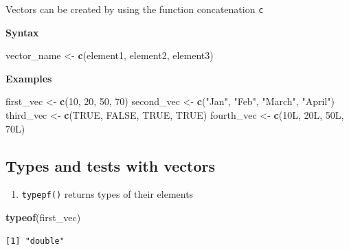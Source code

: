 \documentclass[]{book}
\newenvironment{Shaded}{\begin{snugshade}}{\end{snugshade}}
\newcommand{\DecValTok}[1]{\textcolor[rgb]{0.00,0.00,0.81}{#1}}
\newcommand{\KeywordTok}[1]{\textcolor[rgb]{0.13,0.29,0.53}{\textbf{#1}}}
\newcommand{\NormalTok}[1]{#1}
\newcommand{\OtherTok}[1]{\textcolor[rgb]{0.56,0.35,0.01}{#1}}
\newcommand{\StringTok}[1]{\textcolor[rgb]{0.31,0.60,0.02}{#1}}
\providecommand{\tightlist}{%
  \setlength{\itemsep}{0pt}\setlength{\parskip}{0pt}}
\begin{document}
Vectors can be created by using the function concatenation \texttt{c}

\textbf{Syntax}

\begin{Shaded}
\begin{Highlighting}[]
\NormalTok{vector_name <-}\StringTok{ }\KeywordTok{c}\NormalTok{(element1, element2, element3)}
\end{Highlighting}
\end{Shaded}

\textbf{Examples}

\begin{Shaded}
\begin{Highlighting}[]
\NormalTok{first_vec <-}\StringTok{ }\KeywordTok{c}\NormalTok{(}\DecValTok{10}\NormalTok{, }\DecValTok{20}\NormalTok{, }\DecValTok{50}\NormalTok{, }\DecValTok{70}\NormalTok{)}
\NormalTok{second_vec <-}\StringTok{ }\KeywordTok{c}\NormalTok{(}\StringTok{"Jan"}\NormalTok{, }\StringTok{"Feb"}\NormalTok{, }\StringTok{"March"}\NormalTok{, }\StringTok{"April"}\NormalTok{)}
\NormalTok{third_vec <-}\StringTok{ }\KeywordTok{c}\NormalTok{(}\OtherTok{TRUE}\NormalTok{, }\OtherTok{FALSE}\NormalTok{, }\OtherTok{TRUE}\NormalTok{, }\OtherTok{TRUE}\NormalTok{)}
\NormalTok{fourth_vec <-}\StringTok{ }\KeywordTok{c}\NormalTok{(10L, 20L, 50L, 70L)}
\end{Highlighting}
\end{Shaded}

\hypertarget{types-and-tests-with-vectors}{%
\subsection{Types and tests with vectors}\label{types-and-tests-with-vectors}}

\begin{enumerate}
\def\labelenumi{\arabic{enumi}.}
\tightlist
\item
  \texttt{typepf()} returns types of their elements
\end{enumerate}

\begin{Shaded}
\begin{Highlighting}[]
\KeywordTok{typeof}\NormalTok{(first_vec)}
\end{Highlighting}
\end{Shaded}

\begin{verbatim}
[1] "double"
\end{verbatim}
\end{document}
